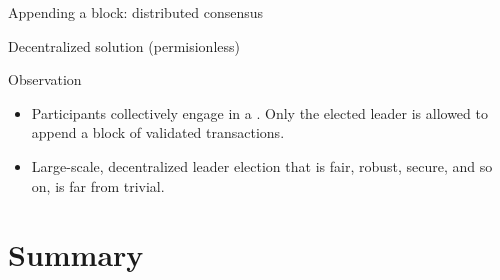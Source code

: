 \begin{slide}{Appending a block: distributed consensus}
  \begin{block}{Decentralized solution (permisionless)}
    \begin{centerfig}
    \end{centerfig}
  \end{block}
  \begin{block}{Observation}
    \begin{itemize}\firmlist
    \item Participants collectively engage in a . Only the elected leader is allowed to
      append a block of validated transactions.
    \item Large-scale, decentralized leader election that is fair, robust, secure, and so on, is far from
      trivial. 
    \end{itemize}
    
  \end{block}
\end{slide}
\section{Summary}
